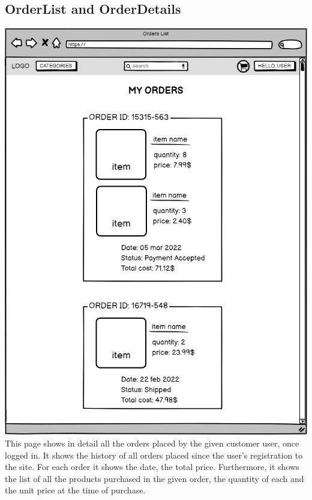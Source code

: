 \subsection{OrderList and OrderDetails}
    \includegraphics[width=\textwidth,height=\textheight,keepaspectratio]{mockups/ordersPageMockup.png}
\\
    This page shows in detail all the orders placed by the given customer user, once logged in. It shows the history of all orders placed since the user's registration to the site. For each order it shows the date, the total price.
    Furthermore, it shows the list of all the products purchased in the given order, the quantity of each and the unit price at the time of purchase.

